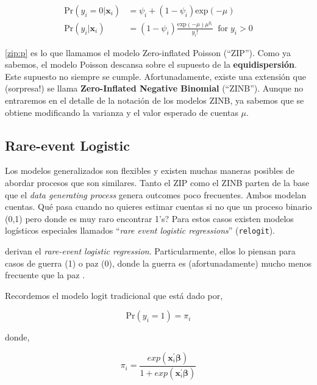 \documentclass[onesided]{article}\usepackage[]{graphicx}\usepackage[]{color}
\begin{document}
\begin{equation}\label{zip:p}
\begin{split}
\text{Pr}(y_{i}=0|\boldsymbol{x}_{i}) &= \psi_{i}+(1-\psi_{i})\text{exp}(-\mu)\\
\text{Pr}(y_{i}|\boldsymbol{x}_{i}) &= (1-\psi_{i})\frac{\text{exp}(-\mu)\mu^{y_{i}}}{y_{i}!} \;\; \text{for} \; y_{i}>0
\end{split}
\end{equation}

\autoref{zip:p} es lo que llamamos el modelo Zero-inflated Poisson (``ZIP''). Como ya sabemos, el modelo Poisson descansa sobre el supuesto de la {\bf equidispersi\'on}. Este supuesto no siempre se cumple. Afortunadamente, existe una extensi\'on que (sorpresa!) se llama {\bf Zero-Inflated Negative Binomial} (``ZINB''). Aunque no entraremos en el detalle de la notaci\'on de los modelos ZINB, ya sabemos que se obtiene modificando la varianza y el valor esperado de cuentas $\mu$.


\subsection{Rare-event Logistic}

Los modelos generalizados son flexibles y existen muchas maneras posibles de abordar procesos que son similares. Tanto el ZIP como el ZINB parten de la base que el \emph{data generating process} genera outcomes poco frecuentes. Ambos modelan cuentas. Qu\'e pasa cuando no quieres estimar cuentas si no que un proceso binario (0,1) pero donde es muy raro encontrar 1's? Para estos casos existen modelos log\'isticos especiales llamados ``\emph{rare event logistic regressions}'' (\texttt{relogit}).

\textcite{King2001} derivan el \emph{rare-event logistic regression}. Particularmente, ellos lo piensan para casos de guerra (1) o paz (0), donde la guerra es (afortunadamente) mucho menos frecuente que la paz \parencite{King2001a}.

Recordemos el modelo logit tradicional que est\'a dado por,

\begin{equation}\label{logit:pr}
\text{Pr}(y_{i}=1)=\pi_{i}
\end{equation}


donde,


\begin{equation}\label{logit}
\pi_{i} = \frac{exp(\boldsymbol{x}_{i}^{\prime}\boldsymbol{\beta})}{1+exp(\boldsymbol{x}_{i}^{\prime}\boldsymbol{\beta})}
\end{equation}
\end{document}
